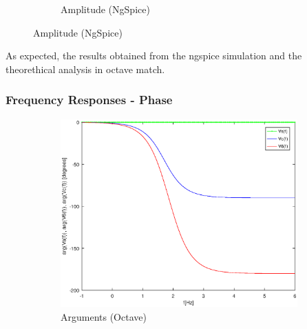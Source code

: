 \begin{figure}[H]
\begin{subfigure}{0.42\textwidth}
\caption{Amplitude (NgSpice)}
\label{fig:second}
\end{subfigure}
\end{figure}

As expected, the results obtained from the ngspice simulation and the theorethical analysis in octave match.

\subsubsection{Frequency Responses - Phase}

\begin{figure}[H] 
\centering
\begin{subfigure}{0.5\textwidth}
\includegraphics[width=\textwidth]{Arguments.eps}
\caption{Arguments (Octave)}
\label{fig:first}
\end{subfigure}
\begin{subfigure}{0.42\textwidth}

\end{subfigure}
\end{figure}
